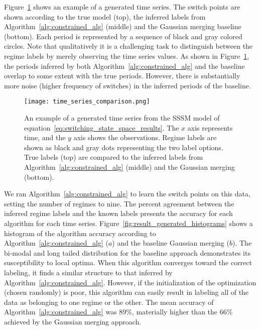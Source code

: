 Figure~\ref{fig:result_generated_time_series_with_labels} shows an example of a generated time series. The switch points are shown according to the true model (top), the inferred labels from Algorithm~\ref{alg:constrained_alg} (middle) and the Gaussian merging baseline (bottom). Each period is represented by a sequence of black and gray colored circles. Note that qualitatively it is a challenging task to distinguish between the regime labels by merely observing the time series values. As shown in Figure~\ref{fig:result_generated_time_series_with_labels}, the periods inferred by both Algorithm~\ref{alg:constrained_alg} and the baseline overlap to some extent with the true periods. However, there is substantially more noise (higher frequency of switches) in the inferred periods of the baseline.

\begin{figure}
\centering
\texttt{[image: time\_series\_comparison.png]}
\caption{An example of a generated time series from the SSSM model of equation~\ref{eq:switching_state_space_results}. The $x$ axis represents time, and the $y$ axis shows the observations. Regime labels are shown as black and gray dots representing the two label options. True labels (top) are compared to the inferred labels from Algorithm~\ref{alg:constrained_alg} (middle) and the Gaussian merging (bottom).}
\label{fig:result_generated_time_series_with_labels}
\end{figure}

We ran Algorithm~\ref{alg:constrained_alg} to learn the switch points on this data, setting the number of regimes to nine. The percent agreement between the inferred regime labels and the known labels presents the accuracy for each algorithm for each time series. Figure~\ref{fig:result_generated_histograms} shows a histogram of the algorithm accuracy according to Algorithm~\ref{alg:constrained_alg} ($a$) and the baseline Gaussian merging ($b$). The bi-modal and long tailed distribution for the baseline approach demonstrates its susceptibility to local optima. When this algorithm converges toward the correct labeling, it finds a similar structure to that inferred by Algorithm~\ref{alg:constrained_alg}. However, if the initialization of the optimization (chosen randomly) is poor, this algorithm can easily result in labeling all of the data as belonging to one regime or the other. The mean accuracy of Algorithm~\ref{alg:constrained_alg} was 89\%, materially higher than the 66\% achieved by the Gaussian merging approach.

